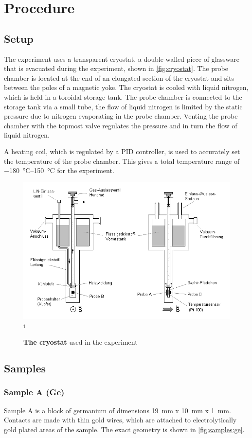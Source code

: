\chapter{Procedure}
\section{Setup}
The experiment uses a transparent cryostat, a double-walled piece of glassware that is evacuated during the experiment, shown in \autoref{fig:cryostat}.
The probe chamber is located at the end of an elongated section of the cryostat and sits between the poles of a magnetic yoke.
The cryostat is cooled with liquid nitrogen, which is held in a toroidal storage tank.
The probe chamber is connected to the storage tank via a small tube, the flow of liquid nitrogen is limited by the static pressure due to nitrogen evaporating in the probe chamber.
Venting the probe chamber with the topmost valve regulates the pressure and in turn the flow of liquid nitrogen.

A heating coil, which is regulated by a PID controller, is used to accurately set the temperature of the probe chamber.
This gives a total temperature range of \SIrange{-180}{150}{\celsius} for the experiment.

\begin{figure}
	\centering
	\includegraphics[width=.7\textwidth]{./img/cryostat.png}i
	\caption[Cryostat]{\textbf{The cryostat} used in the experiment}
	\label{fig:cryostat}
\end{figure}

\section{Samples}
\subsection{Sample A (Ge)}
Sample A is a block of germanium of dimensions \SI{19}{\mm} x \SI{10}{\mm} x \SI{1}{\mm}.
Contacts are made with thin gold wires, which are attached to electrolytically gold plated areas of the sample.
The exact geometry is shown in \autoref{fig:samples:ge}.

